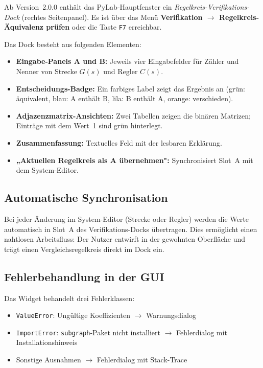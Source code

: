 \documentclass[a4paper,12pt]{article}
\theoremstyle{definition}
\begin{document}
Ab Version~2.0.0 enthält das PyLab-Hauptfenster ein \emph{Regelkreis-Verifikations-Dock}
(rechtes Seitenpanel). Es ist über das Menü \textbf{Verifikation $\rightarrow$ Regelkreis-Äquivalenz prüfen}
oder die Taste \texttt{F7} erreichbar.

Das Dock besteht aus folgenden Elementen:
\begin{itemize}
    \item \textbf{Eingabe-Panels A und B:} Jeweils vier Eingabefelder für
          Zähler und Nenner von Strecke $G(s)$ und Regler $C(s)$.
    \item \textbf{Entscheidungs-Badge:} Ein farbiges Label zeigt das Ergebnis
          an (grün: äquivalent, blau: A enthält B, lila: B enthält A,
          orange: verschieden).
    \item \textbf{Adjazenzmatrix-Ansichten:} Zwei Tabellen zeigen die binären
          Matrizen; Einträge mit dem Wert~1 sind grün hinterlegt.
    \item \textbf{Zusammenfassung:} Textuelles Feld mit der lesbaren Erklärung.
    \item \textbf{„Aktuellen Regelkreis als A übernehmen":} Synchronisiert
          Slot~A mit dem System-Editor.
\end{itemize}

\subsection{Automatische Synchronisation}

Bei jeder Änderung im System-Editor (Strecke oder Regler) werden die Werte
automatisch in Slot~A des Verifikations-Docks übertragen. Dies ermöglicht
einen nahtlosen Arbeitsfluss: Der Nutzer entwirft in der gewohnten Oberfläche
und trägt einen Vergleichsregelkreis direkt im Dock ein.

\subsection{Fehlerbehandlung in der GUI}

Das Widget behandelt drei Fehlerklassen:
\begin{itemize}
    \item \texttt{ValueError}: Ungültige Koeffizienten $\rightarrow$ Warnungsdialog
    \item \texttt{ImportError}: \texttt{subgraph}-Paket nicht installiert $\rightarrow$ Fehlerdialog mit Installationshinweis
    \item Sonstige Ausnahmen $\rightarrow$ Fehlerdialog mit Stack-Trace
\end{itemize}
\end{document}
